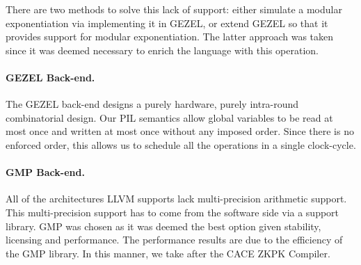 There are two methods to solve this lack of support: either simulate a
modular exponentiation via implementing it in GEZEL, or extend GEZEL
so that it provides support for modular exponentiation. The latter
approach was taken since it was deemed necessary to enrich the
language with this operation.

\paragraph{GEZEL Back-end.}
\label{gezelbackend}
The GEZEL back-end designs a purely hardware, purely intra-round
combinatorial design. Our PIL semantics allow global variables to be
read at most once and written at most once without any imposed
order. Since there is no enforced order, this allows us to schedule
all the operations in a single clock-cycle.

\paragraph{GMP Back-end.}
\label{gmpbackend}
All of the architectures LLVM supports lack multi-precision arithmetic
support.  This multi-precision support has to come from the software
side via a support library. GMP was chosen as it was deemed the best
option given stability, licensing and performance. The performance
results are due to the efficiency of the GMP library. In this manner,
we take after the CACE ZKPK Compiler.

